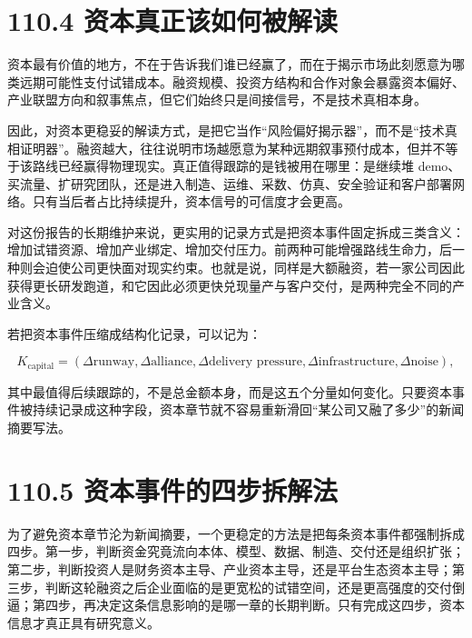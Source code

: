 \section*{110.4 资本真正该如何被解读}


资本最有价值的地方，不在于告诉我们谁已经赢了，而在于揭示市场此刻愿意为哪类远期可能性支付试错成本。融资规模、投资方结构和合作对象会暴露资本偏好、产业联盟方向和叙事焦点，但它们始终只是间接信号，不是技术真相本身。

因此，对资本更稳妥的解读方式，是把它当作“风险偏好揭示器”，而不是“技术真相证明器”。融资越大，往往说明市场越愿意为某种远期叙事预付成本，但并不等于该路线已经赢得物理现实。真正值得跟踪的是钱被用在哪里：是继续堆 demo、买流量、扩研究团队，还是进入制造、运维、采数、仿真、安全验证和客户部署网络。只有当后者占比持续提升，资本信号的可信度才会更高。

对这份报告的长期维护来说，更实用的记录方式是把资本事件固定拆成三类含义：增加试错资源、增加产业绑定、增加交付压力。前两种可能增强路线生命力，后一种则会迫使公司更快面对现实约束。也就是说，同样是大额融资，若一家公司因此获得更长研发跑道，和它因此必须更快兑现量产与客户交付，是两种完全不同的产业含义。

若把资本事件压缩成结构化记录，可以记为：

\begingroup
\scriptsize
\begin{equation*}
K_{\text{capital}} = (\Delta \text{runway}, \Delta \text{alliance}, \Delta \text{delivery pressure}, \Delta \text{infrastructure}, \Delta \text{noise}),
\end{equation*}
\endgroup

其中最值得后续跟踪的，不是总金额本身，而是这五个分量如何变化。只要资本事件被持续记录成这种字段，资本章节就不容易重新滑回“某公司又融了多少”的新闻摘要写法。

\section*{110.5 资本事件的四步拆解法}


为了避免资本章节沦为新闻摘要，一个更稳定的方法是把每条资本事件都强制拆成四步。第一步，判断资金究竟流向本体、模型、数据、制造、交付还是组织扩张；第二步，判断投资人是财务资本主导、产业资本主导，还是平台生态资本主导；第三步，判断这轮融资之后企业面临的是更宽松的试错空间，还是更高强度的交付倒逼；第四步，再决定这条信息影响的是哪一章的长期判断。只有完成这四步，资本信息才真正具有研究意义。


